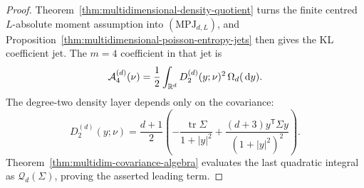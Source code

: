\begin{proof}
Theorem~\ref{thm:multidimensional-density-quotient} turns the finite centred
\(L\)-absolute moment assumption into \((\mathrm{MPJ}_{d,L})\), and
Proposition~\ref{thm:multidimensional-poisson-entropy-jets} then gives the KL
coefficient jet.  The \(m=4\) coefficient in that jet is
\[
\mathcal A_4^{(d)}(\nu)
=\frac12\int_{\mathbb{R}^d}D_2^{(d)}(y;\nu)^2\,\Omega_d(\,\mathrm{d} y).
\]
The degree-two density layer depends only on the covariance:
\[
D_2^{(d)}(y;\nu)=
\frac{d+1}{2}\left(
-\frac{\operatorname{tr}\Sigma}{1+|y|^2}
+\frac{(d+3)y^{\mathsf T}\Sigma y}{(1+|y|^2)^2}
\right).
\]
Theorem~\ref{thm:multidim-covariance-algebra} evaluates the last
quadratic integral as \(\mathcal Q_d(\Sigma)\), proving the asserted leading
term.
\end{proof}
\fi
